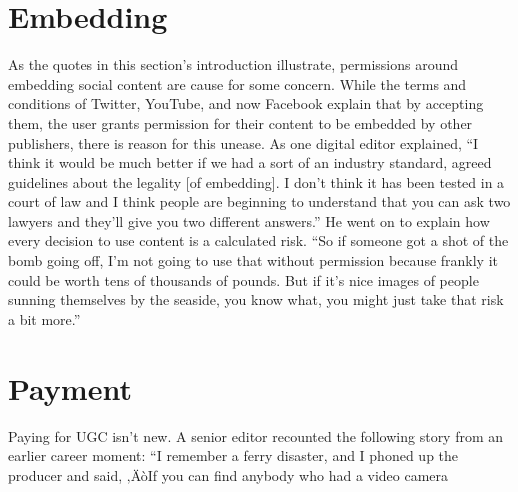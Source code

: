 \documentclass[symmetric, notoc, nobib]{towcenter-book}
\begin{document}
\section{Embedding}
As the quotes in this section's introduction illustrate, permissions around
embedding social content are cause for some concern. While the terms and
conditions of Twitter, YouTube, and now Facebook explain that by accepting
them, the user grants permission for their content to be embedded by
other publishers, there is reason for this unease.
As one digital editor explained, ``I think it would be much better if we had a
sort of an industry standard, agreed guidelines about the legality [of embedding].
I don't think it has been tested in a court of law and I think people are
beginning to understand that you can ask two lawyers and they'll give you
two different answers.''
He went on to explain how every decision to use content is a calculated risk.
``So if someone got a shot of the bomb going off, I'm not going to use that
without permission because frankly it could be worth tens of thousands of
pounds. But if it's nice images of people sunning themselves by the seaside,
you know what, you might just take that risk a bit more.''
\section{Payment}
Paying for UGC isn't new. A senior editor recounted the following story
from an earlier career moment: ``I remember a ferry disaster, and I phoned
up the producer and said, ‚ÄòIf you can find anybody who had a video camera
\end{document}
